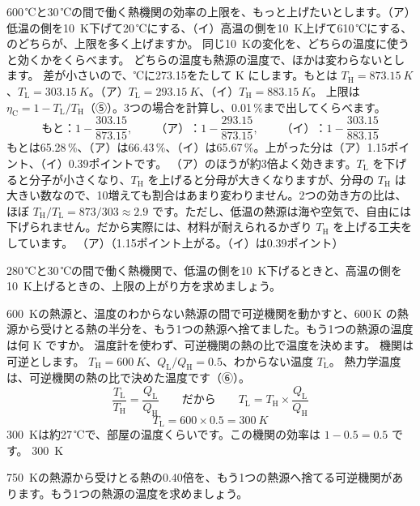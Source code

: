 \label{ph:熱-5:ex10}
\begin{phreidai}
600\,℃と30\,℃の間で働く熱機関の効率の上限を、もっと上げたいとします。（ア）低温の側を\qty{10}{K}下げて20\,℃にする、（イ）高温の側を\qty{10}{K}上げて610\,℃にする、のどちらが、上限を多く上げますか。
\phbamen
同じ\qty{10}{K}の変化を、どちらの温度に使うと効くかをくらべます。
\phmushi
どちらの温度も熱源の温度で、ほかは変わらないとします。
\phzu
差が小さいので、℃に273.15をたして K にします。もとは $T_{\mathrm H}=\qty{873.15}{K}$、$T_{\mathrm L}=\qty{303.15}{K}$。（ア）$T_{\mathrm L}=\qty{293.15}{K}$、（イ）$T_{\mathrm H}=\qty{883.15}{K}$。
\phriyu
上限は $\eta_{\mathrm C}=1-T_{\mathrm L}/T_{\mathrm H}$（⑤）。3つの場合を計算し、0.01\,\%まで出してくらべます。
\phtateru
\[\text{もと}：1-\frac{303.15}{873.15},\qquad\text{（ア）}：1-\frac{293.15}{873.15},\qquad\text{（イ）}：1-\frac{303.15}{883.15}\]
\phtoku
もとは65.28\,\%、（ア）は66.43\,\%、（イ）は65.67\,\%。上がった分は（ア）1.15ポイント、（イ）0.39ポイントです。
\phtashikame
（ア）のほうが約3倍よく効きます。$T_{\mathrm L}$ を下げると分子が小さくなり、$T_{\mathrm H}$ を上げると分母が大きくなりますが、分母の $T_{\mathrm H}$ は大きい数なので、10増えても割合はあまり変わりません。2つの効き方の比は、ほぼ $T_{\mathrm H}/T_{\mathrm L}=873/303\approx2.9$ です。ただし、低温の熱源は海や空気で、自由には下げられません。だから実際には、材料が耐えられるかぎり $T_{\mathrm H}$ を上げる工夫をしています。
\kotae （ア）（1.15ポイント上がる。（イ）は0.39ポイント）
\end{phreidai}
\begin{jibun}
280\,℃と30\,℃の間で働く熱機関で、低温の側を\qty{10}{K}下げるときと、高温の側を\qty{10}{K}上げるときの、上限の上がり方を求めましょう。
\end{jibun}

\label{ph:熱-5:ex11}
\begin{phreidai}[熱の比で温度を測る]
\qty{600}{K}の熱源と、温度のわからない熱源の間で可逆機関を動かすと、600\,K の熱源から受けとる熱の半分を、もう1つの熱源へ捨てました。もう1つの熱源の温度は何 K ですか。
\phbamen
温度計を使わず、可逆機関の熱の比で温度を決めます。
\phmushi
機関は可逆とします。
\phzu
$T_{\mathrm H}=\qty{600}{K}$、$Q_{\mathrm L}/Q_{\mathrm H}=0.5$、わからない温度 $T_{\mathrm L}$。
\phriyu
熱力学温度は、可逆機関の熱の比で決めた温度です（⑥）。
\phtateru
\[\frac{T_{\mathrm L}}{T_{\mathrm H}}=\frac{Q_{\mathrm L}}{Q_{\mathrm H}}\qquad\text{だから}\qquad T_{\mathrm L}=T_{\mathrm H}\times\frac{Q_{\mathrm L}}{Q_{\mathrm H}}\]
\phtoku
\[T_{\mathrm L}=600\times0.5=\qty{300}{K}\]
\phtashikame
\qty{300}{K}は約27\,℃で、部屋の温度くらいです。この機関の効率は $1-0.5=0.5$ です。
\kotae \qty{300}{K}
\end{phreidai}
\begin{jibun}
\qty{750}{K}の熱源から受けとる熱の0.40倍を、もう1つの熱源へ捨てる可逆機関があります。もう1つの熱源の温度を求めましょう。
\end{jibun}

